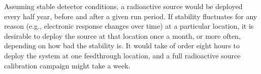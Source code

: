 
Assuming stable detector conditions, a radioactive source would be deployed every half year, before and after a given run period.
If stability fluctuates for any reason (e.g., electronic response changes over time) at a particular location, it is desirable to deploy the source at that location once a month, or more often, depending on how bad the stability is. It would take of order eight hours to deploy the system at one feedthrough location, and a full radioactive source calibration campaign might take a week.

